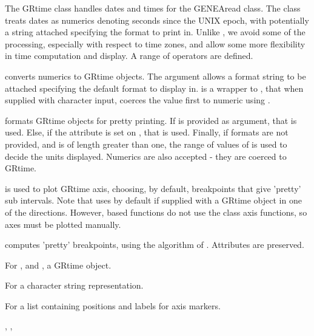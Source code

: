 \documentclass[a4paper]{book}
\begin{document}
\begin{Details}\relax
The GRtime class handles dates and times for the GENEAread class. The class treats dates as numerics denoting seconds since the UNIX epoch, with potentially a string attached specifying the format to print in. Unlike , we avoid some of the processing, especially with respect to time zones, and allow some more flexibility in time computation and display. A range of operators are defined.

 converts numerics to GRtime objects. The  argument allows a format string to be attached specifying the default format to display in.  is a wrapper to , that when supplied with character input, coerces the value first to numeric using .

 formats GRtime objects for pretty printing. If  is provided as argument, that is used. Else, if the  attribute is set on , that is used. Finally, if formats are not provided, and  is of length greater than one, the range of values of  is used to decide the units displayed. Numerics are also accepted - they are coerced to GRtime.

 is used to plot GRtime axis, choosing, by default, breakpoints that give 'pretty' sub intervals. Note that  uses  by default if supplied with a GRtime object in one of the directions. However,  based functions do not use the class axis functions, so axes must be plotted manually.

 computes 'pretty' breakpoints, using the algorithm of . Attributes are preserved.

\end{Details}
%
\begin{Value}
For ,  and , a GRtime object.

For  a character string representation.

For  a list containing positions and labels for axis markers.
\end{Value}
%
\begin{SeeAlso}\relax
{}, , 
\end{SeeAlso}
\end{document}
